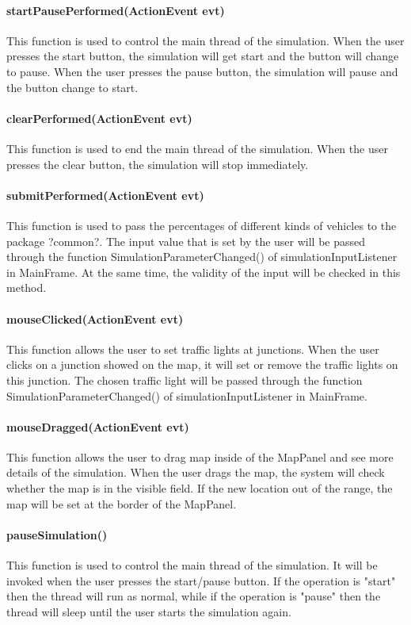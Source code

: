 \documentclass[a4paper,12pt]{article}
\begin{document}
\paragraph{startPausePerformed(ActionEvent evt)} This function is used to control the main thread of the simulation. When the user presses the start button, the simulation will get start and the button will change to pause. When the user presses the pause button, the simulation will pause and the button change to start.
\paragraph{clearPerformed(ActionEvent evt)} This function is used to end the main thread of the simulation. When the user presses the clear button, the simulation will stop immediately.
\paragraph{submitPerformed(ActionEvent evt)} This function is used to pass the percentages of different kinds of vehicles to the package ?common?. The input value that is set by the user will be passed through the function SimulationParameterChanged() of simulationInputListener in MainFrame. At the same time, the validity of the input will be checked in this method.

\paragraph{mouseClicked(ActionEvent evt)} This function allows the user to set traffic lights at junctions. When the user clicks on a junction showed on the map, it will set or remove the traffic lights on this junction. The chosen traffic light will be passed through the function SimulationParameterChanged() of simulationInputListener in MainFrame. 
\paragraph{mouseDragged(ActionEvent evt)} This function allows the user to drag map inside of the MapPanel and see more details of the simulation. When the user drags the map, the system will check whether the map is in the visible field. If the new location out of the range, the map will be set at the border of the MapPanel.

\paragraph{pauseSimulation()} This function is used to control the main thread of the simulation. It will be invoked when the user presses the start/pause button. If the operation is  "start" then the thread will run as normal, while if the operation is "pause" then the thread will sleep until the user starts the simulation again.
\end{document}
